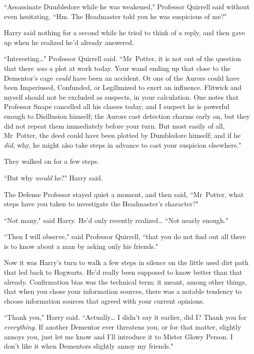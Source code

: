 ``Assassinate Dumbledore while he was weakened," Professor Quirrell said without even hesitating. ``Hm. The Headmaster told you he was suspicious of me?"

Harry said nothing for a second while he tried to think of a reply, and then gave up when he realized he'd already answered.

``Interesting{\ldots}" Professor Quirrell said. ``Mr~Potter, it is not out of the question that there \emph{was} a plot at work today. Your wand ending up that close to the Dementor's cage \emph{could} have been an accident. Or one of the Aurors could have been Imperiused, Confunded, or Legilimized to exert an influence. Flitwick and myself should not be excluded as suspects, in your calculation. One notes that Professor Snape cancelled all his classes today, and I suspect he is powerful enough to Disillusion himself; the Aurors cast detection charms early on, but they did not repeat them immediately before your turn. But most easily of all, Mr~Potter, the deed could have been plotted by Dumbledore himself; and if he \emph{did}, why, he might also take steps in advance to cast your suspicion elsewhere."

They walked on for a few steps.

``But why \emph{would} he?" Harry said.

The Defense Professor stayed quiet a moment, and then said, ``Mr~Potter, what steps have you taken to investigate the Headmaster's character?"

``Not many," said Harry. He'd only recently realized{\ldots} ``Not nearly enough."

``Then I will observe," said Professor Quirrell, ``that you do not find out all there is to know about a man by asking only his friends."

Now it was Harry's turn to walk a few steps in silence on the little used dirt path that led back to Hogwarts. He'd really been supposed to know better than that already. Confirmation bias was the technical term; it meant, among other things, that when you chose your information sources, there was a notable tendency to choose information sources that agreed with your current opinions.

``Thank you," Harry said. ``Actually{\ldots} I didn't say it earlier, did I? Thank you for \emph{everything}. If another Dementor ever threatens you, or for that matter, slightly annoys you, just let me know and I'll introduce it to Mister Glowy Person. I don't like it when Dementors slightly annoy my friends."

